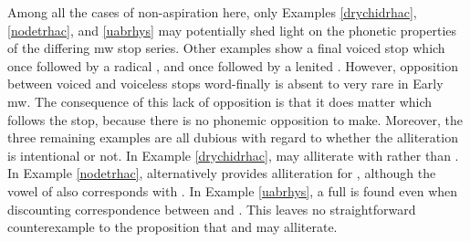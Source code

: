 \begin{mwl}
\end{mwl}


Among all the cases of non-aspiration here, only Examples  \ref{drychidrhac}, \ref{nodetrhac}, and \ref{uabrhys} may potentially shed light on the phonetic properties of the differing \gls{mw} stop series. Other examples show a final voiced stop which once followed by a radical , and once followed by a lenited . However, opposition between voiced and voiceless stops word-finally is absent to very rare in Early \gls{mw}. The consequence of this lack of opposition is that it does matter which  follows the stop, because there is no phonemic opposition to make.
Moreover, the three remaining examples are all dubious with regard to whether the alliteration is intentional or not. In Example \ref{drychidrhac},  may alliterate with  rather than . In Example  \ref{nodetrhac},  alternatively provides alliteration for , although the vowel of    also corresponds with . In Example \ref{uabrhys}, a full  is found even when discounting correspondence between  and . 
This leaves no straightforward counterexample to the proposition that  and  may alliterate.


